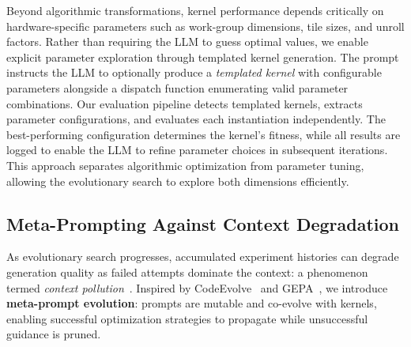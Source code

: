 Beyond algorithmic transformations, kernel performance depends critically on hardware-specific parameters such as work-group dimensions, tile sizes, and unroll factors. Rather than requiring the LLM to guess optimal values, we enable explicit parameter exploration through templated kernel generation.
The prompt instructs the LLM to optionally produce a \textit{templated kernel} with configurable parameters alongside a dispatch function enumerating valid parameter combinations. 
Our evaluation pipeline detects templated kernels, extracts parameter configurations,
and evaluates each instantiation independently. The best-performing configuration determines the kernel's fitness, while all results are logged to enable the LLM to refine parameter choices in subsequent iterations. This approach separates algorithmic optimization from parameter tuning, allowing the evolutionary search to explore both dimensions efficiently.


\subsection{Meta-Prompting Against Context Degradation} \label{sec:metaprompting}

As evolutionary search progresses, accumulated experiment histories can degrade generation quality as failed attempts dominate the context: a phenomenon termed \textit{context pollution}~\citep{yan2026pacevolve}. %
Inspired by CodeEvolve~\citep{codeevolve} and GEPA~\citep{gepa}, we introduce \textbf{meta-prompt evolution}: prompts are mutable and co-evolve with kernels, enabling successful optimization strategies to propagate while unsuccessful guidance is pruned.


